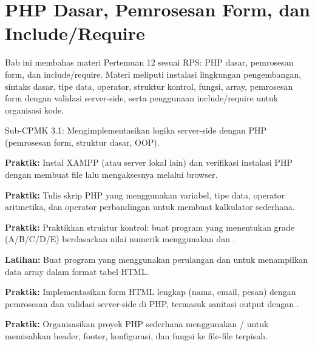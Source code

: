 \documentclass[../main.tex]{subfiles}
\begin{document}
\chapter{PHP Dasar, Pemrosesan Form, dan Include/Require}

Bab ini membahas materi Pertemuan 12 sesuai RPS: PHP dasar, pemrosesan form, dan include/require. Materi meliputi instalasi lingkungan pengembangan, sintaks dasar, tipe data, operator, struktur kontrol, fungsi, array, pemrosesan form dengan validasi server-side, serta penggunaan include/require untuk organisasi kode.

\begin{subcpmk}
  \item Sub-CPMK 3.1: Mengimplementasikan logika server-side dengan PHP (pemrosesan form, struktur dasar, OOP).
\end{subcpmk}

















\begin{aktivitas}
  \item \textbf{Praktik:} Instal XAMPP (atau server lokal lain) dan verifikasi instalasi PHP dengan membuat file  lalu mengaksesnya melalui browser.
  \item \textbf{Praktik:} Tulis skrip PHP yang menggunakan variabel, tipe data, operator aritmetika, dan operator perbandingan untuk membuat kalkulator sederhana.
  \item \textbf{Praktik:} Praktikkan struktur kontrol: buat program yang menentukan grade (A/B/C/D/E) berdasarkan nilai numerik menggunakan  dan .
  \item \textbf{Latihan:} Buat program yang menggunakan perulangan  dan  untuk menampilkan data array dalam format tabel HTML.
  \item \textbf{Praktik:} Implementasikan form HTML lengkap (nama, email, pesan) dengan pemrosesan dan validasi server-side di PHP, termasuk sanitasi output dengan .
  \item \textbf{Praktik:} Organisasikan proyek PHP sederhana menggunakan / untuk memisahkan header, footer, konfigurasi, dan fungsi ke file-file terpisah.
\end{aktivitas}
\end{document}
